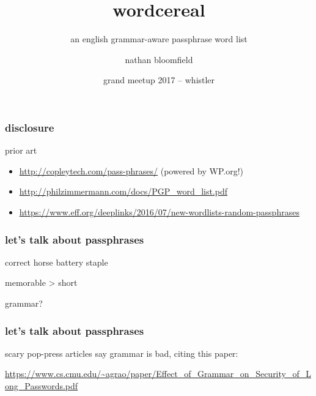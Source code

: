 \documentclass[xetex]{beamer}
\title{wordcereal}
\subtitle{an english grammar-aware passphrase word list}
\author{nathan bloomfield}
\date{grand meetup 2017 -- whistler}
\begin{document}



\frame{\titlepage}



\begin{frame}
\frametitle{disclosure}

prior art

\begin{itemize}
\item \url{http://copleytech.com/pass-phrases/} (powered by WP.org!)
\item \url{http://philzimmermann.com/docs/PGP_word_list.pdf}
\item \url{https://www.eff.org/deeplinks/2016/07/new-wordlists-random-passphrases}
\end{itemize}
\end{frame}



\begin{frame}
\frametitle{let's talk about passphrases}

\pause

\begin{center}
correct horse battery staple

\pause

\vspace{1cm}

memorable > short

\pause

\vspace{1cm}

grammar?
\end{center}
\end{frame}



\begin{frame}
\frametitle{let's talk about passphrases}

scary pop-press articles say grammar is bad, citing this paper:

\vspace{0.3cm}

\url{https://www.cs.cmu.edu/~agrao/paper/Effect_of_Grammar_on_Security_of_Long_Passwords.pdf}

\pause

\begin{center}
%
\end{center}

\end{frame}
\end{document}
